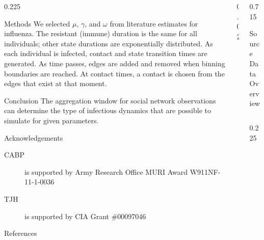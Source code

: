 \documentclass[final]{beamer} %
\newcommand{\spaceProp}{0.02}
\newcommand{\spacer}{\begin{column}{\spaceProp\paperwidth}\end{column}}
\newenvironment{oneCol}{\begin{column}[t]{0.225\paperwidth}}{\end{column}}
\newenvironment{threeCol}{\begin{column}[t]{0.715\paperwidth}}{\end{column}}
\begin{document}
\begin{frame}{}
\begin{columns}[t]
\begin{oneCol}
\begin{block}{Methods}
We selected $\mu$, $\gamma$, and $\omega$ from literature estimates for influenza.  The resistant (immune) duration is the same for all individuals; other state durations are exponentially distributed.  As each individual is infected, contact and state transition times are generated.  As time passes, edges are added and removed when binning boundaries are reached.  At contact times, a contact is chosen from the edges that exist at that moment. 
    \end{block}
    \begin{block}{Conclusion}
The aggregation window for social network observations can determine the type of infectious dynamics that are possible to simulate for given parameters.
    \end{block}
    \begin{block}{Acknowledgements}
      \begin{description}
      \item[CABP] is supported by Army Research Office MURI Award W911NF-11-1-0036
      \item[TJH] is supported by CIA Grant \#00097046
      \end{description}
    \end{block}
    \begin{block}{References}
      \nocite{*} %
      \small{
      \vspace{0.75in}}
    \end{block}
    \end{oneCol}
    \spacer{}
    \begin{threeCol}
    \begin{block}{Source Data Overview}
    \begin{columns}
    \begin{oneCol}
      \begin{figure}

\end{figure}
\end{oneCol}
\end{columns}
\end{block}
\end{threeCol}
\end{columns}
\end{frame}
\end{document}
